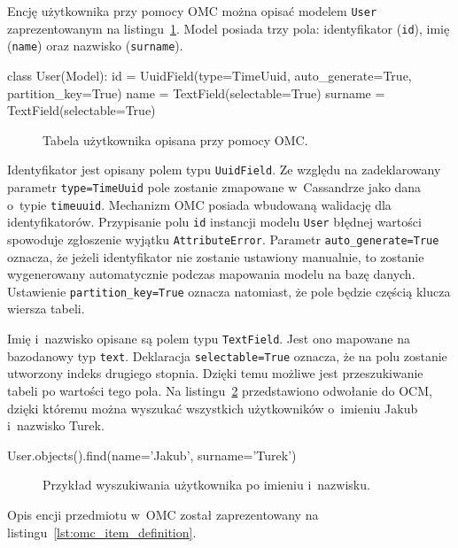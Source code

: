 Encję użytkownika przy pomocy OMC można opisać modelem \verb+User+ zaprezentowanym na listingu~\ref{lst:omc_user_definition}. Model posiada trzy pola: identyfikator (\verb+id+), imię (\verb+name+) oraz nazwisko (\verb+surname+).

\begin{verbbox}
class User(Model):
    id = UuidField(type=TimeUuid, auto_generate=True, partition_key=True)
    name = TextField(selectable=True)
    surname = TextField(selectable=True)
\end{verbbox}

\begin{figure}[ht!]
	\centering
	\theverbbox
	\caption{Tabela użytkownika opisana przy pomocy OMC.}
	\label{lst:omc_user_definition}
\end{figure}

Identyfikator jest opisany polem typu \verb+UuidField+. Ze względu na zadeklarowany parametr \verb+type=TimeUuid+ pole zostanie zmapowane w~Cassandrze jako dana o~typie \verb+timeuuid+. Mechanizm OMC posiada wbudowaną walidację dla identyfikatorów. Przypisanie polu \verb+id+ instancji modelu \verb+User+ błędnej wartości spowoduje zgłoszenie wyjątku \verb+AttributeError+. Parametr \verb+auto_generate=True+ oznacza, że jeżeli identyfikator nie zostanie ustawiony manualnie, to zostanie wygenerowany automatycznie podczas mapowania modelu na bazę danych. Ustawienie \verb+partition_key=True+ oznacza natomiast, że pole będzie częścią klucza wiersza tabeli. 

Imię i~nazwisko opisane są polem typu \verb+TextField+. Jest ono mapowane na bazodanowy typ \verb+text+. Deklaracja \verb+selectable=True+ oznacza, że na polu zostanie utworzony indeks drugiego stopnia. Dzięki temu możliwe jest przeszukiwanie tabeli po wartości tego pola. Na listingu~\ref{lst:user_search_by_name_surname} przedstawiono odwołanie do OCM, dzięki któremu można wyszukać wszystkich użytkowników o~imieniu Jakub i~nazwisko Turek.

\begin{verbbox}
	User.objects().find(name='Jakub', surname='Turek')
\end{verbbox}

\begin{figure}[ht!]
	\centering
	\theverbbox
	\caption{Przykład wyszukiwania użytkownika po imieniu i~nazwisku.}
	\label{lst:user_search_by_name_surname}
\end{figure}

Opis encji przedmiotu w~OMC został zaprezentowany na listingu~\ref{lst:omc_item_definition}. 

